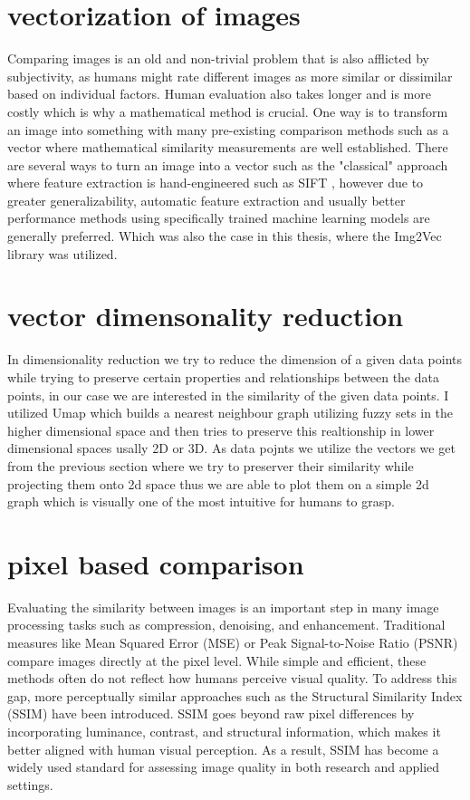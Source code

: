 \documentclass[
  a4paper,  %
  twoside,  %
  bibliography=totoc,
  headsepline,
  cleardoublepage=empty,
  parskip=half,
  draft=false
]{scrbook}
\begin{document}
\section{vectorization of images}
Comparing images is an old and non-trivial problem that is also afflicted by subjectivity, as humans might rate different images as more similar or dissimilar based on individual factors. Human evaluation also takes longer and is more costly which is why a mathematical method is crucial. 
One way is to transform an image into something with many pre-existing comparison methods such as a vector where mathematical similarity measurements are well established. There are several ways to turn an image into a vector such as the "classical" approach where feature extraction is hand-engineered such as SIFT \cite{inbook}, however due to greater generalizability, automatic feature extraction and usually better performance methods using specifically trained machine learning models are generally preferred. Which was also the case in this thesis, where the Img2Vec library \cite{patel2019img2vec} was utilized.

\section{vector dimensonality reduction}
\label{dimRed}
In dimensionality reduction we try to reduce the dimension of a given data points while trying to preserve certain properties and relationships between the data points, in our case we are interested in the similarity of the given data points. I utilized Umap \cite{umap} which builds a nearest neighbour graph utilizing fuzzy sets in the higher dimensional space and then tries to preserve this realtionship in lower dimensional spaces usally 2D or 3D. 
As data pojnts we utilize the vectors we get from the previous section where we try to preserver their similarity while projecting them onto 2d space thus we are able to plot them on a simple 2d graph which is visually one of the most intuitive for humans to grasp. 

\section{pixel based comparison}
Evaluating the similarity between images is an important step in many image processing tasks such as compression, denoising, and enhancement. Traditional measures like Mean Squared Error (MSE) or Peak Signal-to-Noise Ratio (PSNR) compare images directly at the pixel level. While simple and efficient, these methods often do not reflect how humans perceive visual quality. To address this gap, more perceptually similar approaches such as the Structural Similarity Index (SSIM) \cite{ssim} have been introduced. SSIM goes beyond raw pixel differences by incorporating luminance, contrast, and structural information, which makes it better aligned with human visual perception. As a result, SSIM has become a widely used standard for assessing image quality in both research and applied settings.
\end{document}
